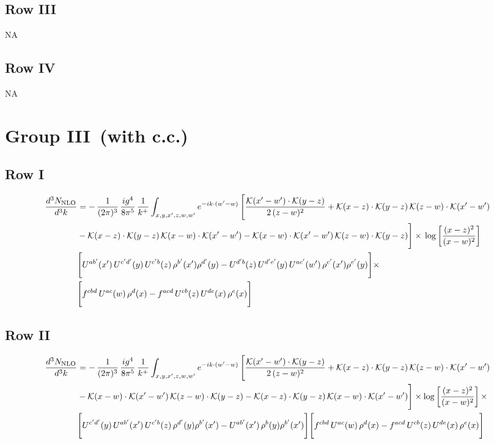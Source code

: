 \documentclass[9pt]{article}
\numberwithin{equation}{section}
\begin{document}
\subsection{Row III}
\textsc{NA}
\subsection{Row IV}
\textsc{NA}
\section{Group III\, (with c.c.)}
\subsection{Row I}
\begin{align}
\frac{d^{3}N_{\rm NLO}}{d^{3}k} & = -\,\frac{1}{(2\pi)^{3}}\,\frac{ig^{4}}{8\pi^{5}}\,\frac{1}{k^{+}}\int_{x,y,x',z,w,w'} e^{-ik\cdot(w'-w)}\,\Bigg[\frac{\mathcal{K}(x'-w')\cdot\mathcal{K}(y-z)}{2\,(z-w)^{2}}+\mathcal{K}(x-z)\cdot\mathcal{K}(y-z)\,\mathcal{K}(z-w)\cdot\mathcal{K}(x'-w')\notag \\
& -\mathcal{K}(x-z)\cdot\mathcal{K}(y-z)\,\mathcal{K}(x-w)\cdot\mathcal{K}(x'-w')-\mathcal{K}(x-w)\cdot\mathcal{K}(x'-w')\,\mathcal{K}(z-w)\cdot\mathcal{K}(y-z)\Bigg]\times\, \log\left[\frac{(x-z)^{2}}{(x-w)^{2}}\right]\notag \\
& \Bigg[U^{ab'}(x')\,U^{c'd'}(y)\,U^{c'b}(z)\,\rho^{b'}(x')\rho^{d'}(y)-U^{d'b}(z)\,U^{d'e'}(y)\,U^{ac'}(w')\,\rho^{c'}(x')\rho^{e'}(y)\Bigg]\times\notag \\ & \Bigg[f^{cbd}\,U^{ac}(w)\,\rho^{d}(x)-f^{acd}\, U^{cb}(z)\,U^{de}(x)\,\rho^{e}(x)\Bigg]
\end{align}
\subsection{Row II}
\begin{align}
\frac{d^{3}N_{\rm NLO}}{d^{3}k} & = -\,\frac{1}{(2\pi)^{3}}\,\frac{ig^{4}}{8\pi^{5}}\,\frac{1}{k^{+}}\int_{x,y,x',z,w,w'} e^{-ik\cdot(w'-w)}\,\Bigg[\frac{\mathcal{K}(x'-w')\cdot\mathcal{K}(y-z)}{2\,(z-w)^{2}} +\mathcal{K}(x-z)\cdot\mathcal{K}(y-z)\,\mathcal{K}(z-w)\cdot\mathcal{K}(x'-w')\notag \\ & -\mathcal{K}(x-w)\cdot\mathcal{K}(x'-w')\,\mathcal{K}(z-w)\cdot\mathcal{K}(y-z)-\mathcal{K}(x-z)\cdot\mathcal{K}(y-z)\,\mathcal{K}(x-w)\cdot\mathcal{K}(x'-w')\Bigg]\times\log\left[\frac{(x-z)^{2}}{(x-w)^{2}}\right]\times\notag \\
&\Bigg[U^{c'd'}(y)\,U^{ab'}(x')\,U^{c'b}(z)\,\rho^{d'}(y)\rho^{b'}(x')-U^{ab'}(x')\,\rho^{b}(y)\rho^{b'}(x')\Bigg]\Bigg[f^{cbd}\,U^{ac}(w)\,\rho^{d}(x)-f^{acd}\, U^{cb}(z)\,U^{de}(x)\,\rho^{e}(x)\Bigg]
\end{align}
\end{document}
